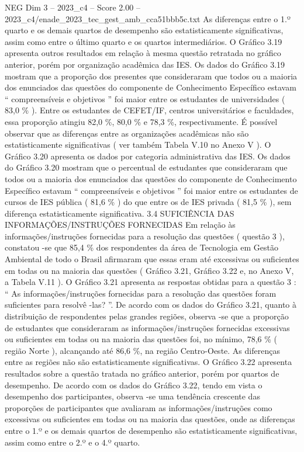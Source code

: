 \begin{textsample}{NEG Dim 3 – 2023\_c4 – Score 2.00 – 2023\_c4/enade\_2023\_tec\_gest\_amb\_cca51bbb5c.txt}
As diferenças entre o 1.º quarto e os demais quartos de desempenho são estatisticamente significativas, assim como entre o último quarto e os quartos intermediários.
O Gráfico 3.19 apresenta outros resultados em relação à mesma questão retratada no gráfico anterior, porém por organização acadêmica das IES.
Os dados do Gráfico 3.19 mostram que a proporção dos presentes que consideraram que todos ou a maioria dos enunciados das questões do componente de Conhecimento Específico estavam “ compreensíveis e objetivos ” foi maior entre os estudantes de universidades ( 83,0 \% ).
Entre os estudantes de CEFET/IF, centros universitários e faculdades, essa proporção atingiu 82,0 \%, 80,0 \% e 78,3 \%, respectivamente.
É possível observar que as diferenças entre as organizações acadêmicas não são estatisticamente significativas ( ver também Tabela V.10 no Anexo V ).
O Gráfico 3.20 apresenta os dados por categoria administrativa das IES.
Os dados do Gráfico 3.20 mostram que o percentual de estudantes que consideraram que todos ou a maioria dos enunciados das questões do componente de Conhecimento Específico estavam “ compreensíveis e objetivos ” foi maior entre os estudantes de cursos de IES pública ( 81,6 \% ) do que entre os de IES privada ( 81,5 \% ), sem diferença estatisticamente significativa. 3.4 SUFICIÊNCIA DAS INFORMAÇÕES/INSTRUÇÕES FORNECIDAS Em relação às informações/instruções fornecidas para a resolução das questões ( questão 3 ), constatou -se que 85,4 \% dos respondentes da área de Tecnologia em Gestão Ambiental de todo o Brasil afirmaram que essas eram até excessivas ou suficientes em todas ou na maioria das questões ( Gráfico 3.21, Gráfico 3.22 e, no Anexo V, a Tabela V.11 ).
O Gráfico 3.21 apresenta as respostas obtidas para a questão 3 : “ As informações/instruções fornecidas para a resolução das questões foram suficientes para resolvê -las? ”.
De acordo com os dados do Gráfico 3.21, quanto à distribuição de respondentes pelas grandes regiões, observa -se que a proporção de estudantes que consideraram as informações/instruções fornecidas excessivas ou suficientes em todas ou na maioria das questões foi, no mínimo, 78,6 \% ( região Norte ), alcançando até 86,6 \%, na região Centro-Oeste.
As diferenças entre as regiões não são estatisticamente significativas.
O Gráfico 3.22 apresenta resultados sobre a questão tratada no gráfico anterior, porém por quartos de desempenho.
De acordo com os dados do Gráfico 3.22, tendo em vista o desempenho dos participantes, observa -se uma tendência crescente das proporções de participantes que avaliaram as informações/instruções como excessivas ou suficientes em todas ou na maioria das questões, onde as diferenças entre o 1.º e os demais quartos de desempenho são estatisticamente significativas, assim como entre o 2.º e o 4.º quarto.

\end{textsample}
